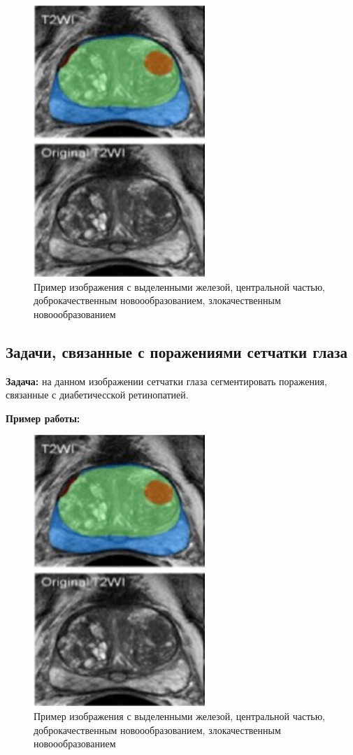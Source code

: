 \begin{figure}[h] 
  \center
  \includegraphics [scale=0.8] {images/prostate.png}
  \caption{ Пример изображения с выделенными {\color{blue} железой}, {\color{green} центральной частью}, {\color{orange} доброкачественным новоообразованием}, {\color{red} злокачественным новоообразованием} \cite{prostate-cancer}} 
  \label{fig:prostate}  
\end{figure}



\subsection{Задачи, связанные с поражениями сетчатки глаза}

{\bf Задача:} на данном изображении сетчатки глаза сегментировать поражения, связанные с диабетичесской ретинопатией.

{\bf Пример работы:}

\begin{figure}[h] 
  \center
  \includegraphics [scale=0.8] {images/prostate.png}
  \caption{ Пример изображения с выделенными {\color{blue} железой}, {\color{green} центральной частью}, {\color{orange} доброкачественным новоообразованием}, {\color{red} злокачественным новоообразованием}} 
  \label{prostate}  
\end{figure}


